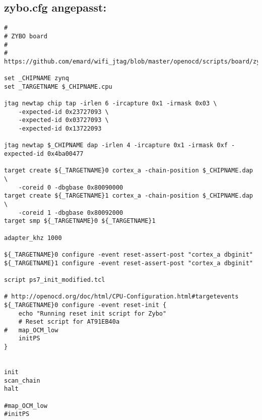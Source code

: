 \subsection{zybo.cfg angepasst:}
\label{anhang:zybo.cfg}
\lstset{language=tcl}
\begin{lstlisting}
#
# ZYBO board
#
# https://github.com/emard/wifi_jtag/blob/master/openocd/scripts/board/zybo.cfg 

set _CHIPNAME zynq
set _TARGETNAME $_CHIPNAME.cpu

jtag newtap chip tap -irlen 6 -ircapture 0x1 -irmask 0x03 \
    -expected-id 0x23727093 \
    -expected-id 0x03727093 \
    -expected-id 0x13722093

jtag newtap $_CHIPNAME dap -irlen 4 -ircapture 0x1 -irmask 0xf -expected-id 0x4ba00477

target create ${_TARGETNAME}0 cortex_a -chain-position $_CHIPNAME.dap \
    -coreid 0 -dbgbase 0x80090000
target create ${_TARGETNAME}1 cortex_a -chain-position $_CHIPNAME.dap \
    -coreid 1 -dbgbase 0x80092000
target smp ${_TARGETNAME}0 ${_TARGETNAME}1

adapter_khz 1000

${_TARGETNAME}0 configure -event reset-assert-post "cortex_a dbginit"
${_TARGETNAME}1 configure -event reset-assert-post "cortex_a dbginit"

script ps7_init_modified.tcl

# http://openocd.org/doc/html/CPU-Configuration.html#targetevents
${_TARGETNAME}0 configure -event reset-init {
	echo "Running reset init script for Zybo"
	# Reset script for AT91EB40a
#	map_OCM_low
	initPS
}


init
scan_chain
halt

#map_OCM_low
#initPS
\end{lstlisting}


\label{anhang:zynq_7000.cfg}



